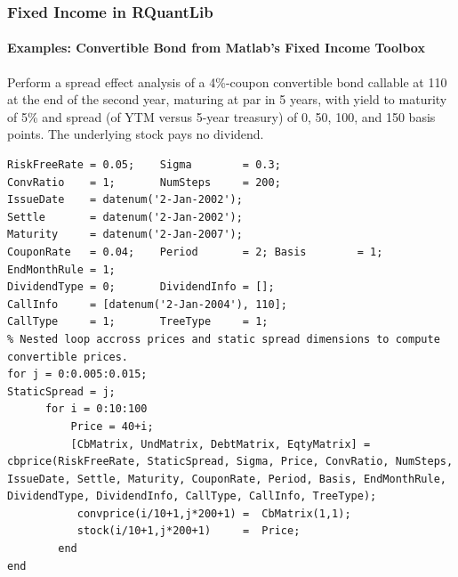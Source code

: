 \documentclass[compress]{beamer}
\begin{document}
\begin{frame}[fragile]
	\frametitle{Fixed Income in RQuantLib}
	\framesubtitle{Examples: Convertible Bond from Matlab's Fixed Income Toolbox}	
	\scriptsize
Perform a spread effect analysis of a 4\%-coupon convertible bond callable at 110 at the end of the second year, maturing at par in 5 years, with yield to maturity of 5\% and spread (of YTM versus 5-year treasury) of 0, 50, 100, and 150 basis points. The underlying stock pays no dividend. 
\lstset{language=Matlab,basicstyle=\tiny}
	\begin{lstlisting}
RiskFreeRate = 0.05;	Sigma        = 0.3;
ConvRatio    = 1;   	NumSteps     = 200;
IssueDate    = datenum('2-Jan-2002');
Settle       = datenum('2-Jan-2002');
Maturity     = datenum('2-Jan-2007');
CouponRate   = 0.04;    Period       = 2; Basis        = 1;		EndMonthRule = 1;
DividendType = 0;		DividendInfo = [];
CallInfo     = [datenum('2-Jan-2004'), 110]; 
CallType     = 1;		TreeType     = 1;   
% Nested loop accross prices and static spread dimensions to compute convertible prices.
for j = 0:0.005:0.015;
StaticSpread = j;
      for i = 0:10:100
          Price = 40+i;
          [CbMatrix, UndMatrix, DebtMatrix, EqtyMatrix] =  cbprice(RiskFreeRate, StaticSpread, Sigma, Price, ConvRatio, NumSteps, IssueDate, Settle, Maturity, CouponRate, Period, Basis, EndMonthRule, DividendType, DividendInfo, CallType, CallInfo, TreeType);   
           convprice(i/10+1,j*200+1) =  CbMatrix(1,1);
           stock(i/10+1,j*200+1)     =  Price;
        end    
end
\end{lstlisting}
\end{frame}
\end{document}
